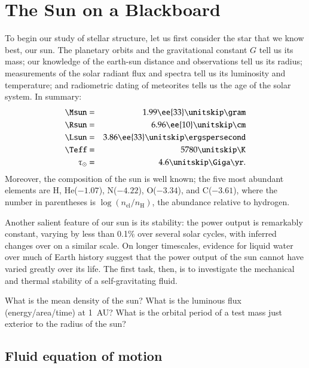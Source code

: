 \chapter{The Sun on a Blackboard}\label{ch.introduction}

To begin our study of stellar structure, let us first consider the star that we know best, our sun.  The planetary orbits and the gravitational constant $G$ tell us its mass; our knowledge of the earth-sun distance and observations tell us its radius; measurements of the solar radiant flux and spectra tell us its luminosity and temperature; and radiometric dating of meteorites tells us the age of the solar system. In summary:
\begin{eqnarray*}
\Msun &=& 1.99\ee{33}\nsp\gram\\
\Rsun &=& 6.96\ee{10}\nsp\cm\\
\Lsun &=& 3.86\ee{33}\nsp\ergspersecond\\
\Teff &=& 5780\nsp\K\\
\tau_{\sun} &=& 4.6\nsp\Giga\yr.
\end{eqnarray*}
Moreover, the composition of the sun is well known\cite{anders.grevesse:abundances,Asplund2005The-Solar-Chemi}; the five most abundant elements are H, He($-1.07$), N($-4.22$), O($-3.34$), and C($-3.61$), where the number in parentheses is $\log(n_{\mathrm{el}}/n_{\mathrm{H}})$, the abundance relative to hydrogen.

Another salient feature of our sun is its stability: the power output is remarkably constant, varying by less than 0.1\% over several solar cycles\cite{Willson1991The-suns-lumino}, with inferred changes over  on a similar scale\cite{Frohlich2004Solar-radiative}.  On longer timescales, evidence for liquid water over much of Earth history suggest that the power output of the sun cannot have varied greatly over its life.  The first task, then, is to investigate the mechanical and thermal stability of a self-gravitating fluid.

\begin{exercisebox}
What is the mean density of the sun? What is the luminous flux (energy/area/time) at 1~AU? What is the orbital period of a test mass just exterior to the radius of the sun?
\end{exercisebox}

\section{Fluid equation of motion}\label{s.fluid-introduction}

